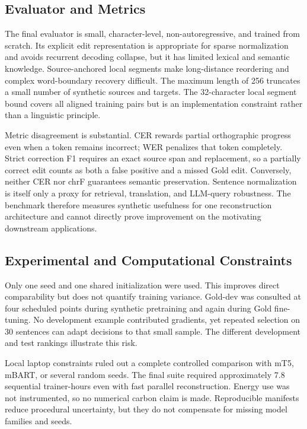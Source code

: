 \documentclass[12pt, a4paper, twoside, openany]{report}
\begin{document}
\subsection{Evaluator and Metrics}

The final evaluator is small, character-level, non-autoregressive, and trained from scratch. Its explicit edit representation is appropriate for sparse normalization and avoids recurrent decoding collapse, but it has limited lexical and semantic knowledge. Source-anchored local segments make long-distance reordering and complex word-boundary recovery difficult. The maximum length of 256 truncates a small number of synthetic sources and targets. The 32-character local segment bound covers all aligned training pairs but is an implementation constraint rather than a linguistic principle.

Metric disagreement is substantial. CER rewards partial orthographic progress even when a token remains incorrect; WER penalizes that token completely. Strict correction F1 requires an exact source span and replacement, so a partially correct edit counts as both a false positive and a missed Gold edit. Conversely, neither CER nor chrF guarantees semantic preservation. Sentence normalization is itself only a proxy for retrieval, translation, and LLM-query robustness. The benchmark therefore measures synthetic usefulness for one reconstruction architecture and cannot directly prove improvement on the motivating downstream applications.

\subsection{Experimental and Computational Constraints}

Only one seed and one shared initialization were used. This improves direct comparability but does not quantify training variance. Gold-dev was consulted at four scheduled points during synthetic pretraining and again during Gold fine-tuning. No development example contributed gradients, yet repeated selection on 30 sentences can adapt decisions to that small sample. The different development and test rankings illustrate this risk.

Local laptop constraints ruled out a complete controlled comparison with mT5, mBART, or several random seeds. The final suite required approximately 7.8 sequential trainer-hours even with fast parallel reconstruction. Energy use was not instrumented, so no numerical carbon claim is made. Reproducible manifests reduce procedural uncertainty, but they do not compensate for missing model families and seeds.
\end{document}
